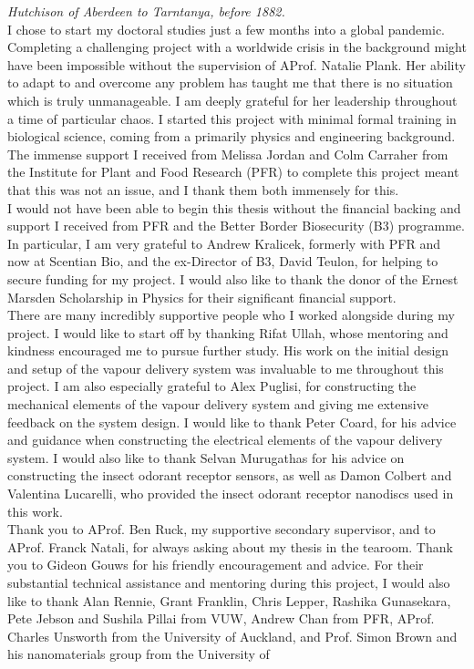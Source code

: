 \documentclass[
  a4paper,
]{scrbook}
\begin{document}
\textit{Hutchison of Aberdeen to Tarntanya, before 1882.} \\[5pt] 
I chose to start my doctoral studies just a few months into a global pandemic. Completing a challenging project with a worldwide crisis in the background might have been impossible without the supervision of AProf. Natalie Plank. Her ability to adapt to and overcome any problem has taught me that there is no situation which is truly unmanageable. I am deeply grateful for her leadership throughout a time of particular chaos. \newpage
\fancyhf{} %
\thispagestyle{fancy} %
\renewcommand{\headrulewidth}{0pt}
\fancyfoot[L]{\thepage} %
I started this project with minimal formal training in biological science, coming from a primarily physics and engineering background. \\[5pt] The immense support I received from Melissa Jordan and Colm Carraher from the Institute for Plant and Food Research (PFR) to complete this project meant that this was not an issue, and I thank them both immensely for this. \\[5pt] I would not have been able to begin this thesis without the financial backing and support I received from PFR and the Better Border Biosecurity (B3) programme. In particular, I am very grateful to Andrew Kralicek, formerly with PFR and now at Scentian Bio, and the ex-Director of B3, David Teulon, for helping to secure funding for my project. I would also like to thank the donor of the Ernest Marsden Scholarship in Physics for their significant financial support. \\[5pt] There are many incredibly supportive people who I worked alongside during my project. I would like to start off by thanking Rifat Ullah, whose mentoring and kindness encouraged me to pursue further study. His work on the initial design and setup of the vapour delivery system was invaluable to me throughout this project. I am also especially grateful to Alex Puglisi, for constructing the mechanical elements of the vapour delivery system and giving me extensive feedback on the system design. I would like to thank Peter Coard, for his advice and guidance when constructing the electrical elements of the vapour delivery system. I would also like to thank Selvan Murugathas for his advice on constructing the insect odorant receptor sensors, as well as Damon Colbert and Valentina Lucarelli, who provided the insect odorant receptor nanodiscs used in this work. \\[5pt] Thank you to AProf. Ben Ruck, my supportive secondary supervisor, and to AProf. Franck Natali, for always asking about my thesis in the tearoom. Thank you to Gideon Gouws for his friendly encouragement and advice. For their substantial technical assistance and mentoring during this project, I would also like to thank Alan Rennie, Grant Franklin, Chris Lepper, Rashika Gunasekara, Pete Jebson and Sushila Pillai from VUW, Andrew Chan from PFR, AProf. Charles Unsworth from the University of Auckland, and Prof. Simon Brown and his nanomaterials group from the University of 
\end{document}
